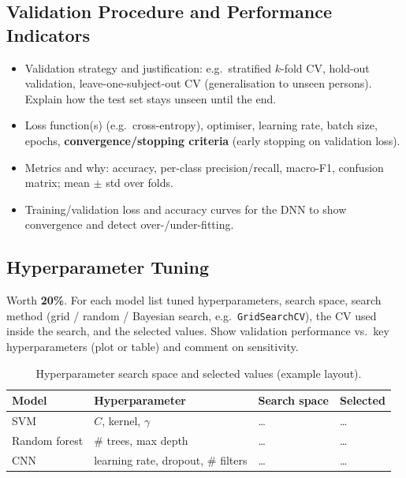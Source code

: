 \documentclass[10pt,a4paper,titlepage]{article}
\newcommand{\placeholder}[1]{\begin{placeholderbox}#1\end{placeholderbox}}
\begin{document}
\subsection{Validation Procedure and Performance Indicators}
\placeholder{%
\begin{itemize}
  \item Validation strategy and justification: e.g.\ stratified $k$-fold CV,
        hold-out validation, leave-one-subject-out CV (generalisation to unseen
        persons). Explain how the test set stays unseen until the end.
  \item Loss function(s) (e.g.\ cross-entropy), optimiser, learning rate,
        batch size, epochs, \textbf{convergence/stopping criteria} (early
        stopping on validation loss).
  \item Metrics and why: accuracy, per-class precision/recall, macro-F1,
        confusion matrix; mean $\pm$ std over folds.
  \item Training/validation loss and accuracy curves for the DNN to show
        convergence and detect over-/under-fitting.
\end{itemize}}

\subsection{Hyperparameter Tuning}
\placeholder{%
Worth \textbf{20\%}. For each model list tuned hyperparameters, search space,
search method (grid / random / Bayesian search, e.g.\
\texttt{GridSearchCV}), the CV used inside the search, and the selected values.
Show validation performance vs.\ key hyperparameters (plot or table) and
comment on sensitivity.}

\begin{table}[h]
  \centering
  \caption{Hyperparameter search space and selected values (example layout).}
  \label{tab:hyper}
  \begin{tabular}{@{}llll@{}}
    \toprule
    Model & Hyperparameter & Search space & Selected \\
    \midrule
    SVM & $C$, kernel, $\gamma$ & \ldots & \ldots \\
    Random forest & \# trees, max depth & \ldots & \ldots \\
    CNN & learning rate, dropout, \# filters & \ldots & \ldots \\
    \bottomrule
  \end{tabular}
\end{table}
\end{document}
